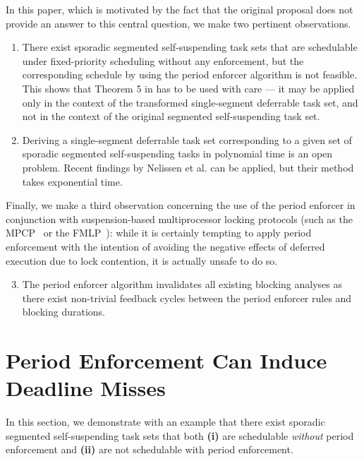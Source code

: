In this paper, which is motivated by the fact that the original proposal \cite{Raj:suspension1991} does not provide an answer to this central question, 
we make two pertinent observations.
\begin{enumerate}
	\item There exist sporadic segmented self-suspending task sets that are schedulable under fixed-priority scheduling without any enforcement, but the corresponding schedule by using the period enforcer algorithm is not feasible. This shows that Theorem 5 in \cite{Raj:suspension1991} has to be  used with care --- it may be applied only in the context of the transformed single-segment deferrable task set, and not in the context of the original segmented self-suspending task set.

	\item Deriving a single-segment deferrable task set corresponding to a given set of sporadic segmented self-suspending tasks in polynomial time is an open problem. Recent findings by Nelissen et al. \cite{ecrts15nelissen} can be applied, but their method takes exponential time.
\end{enumerate}
%
Finally, we make a third observation concerning the use of the period enforcer in conjunction with suspension-based multiprocessor locking protocols (such as the MPCP~\cite{LNR:09,Ra:90} or the FMLP~\cite{BLBA:07,BA:08}): while it is certainly tempting to apply period enforcement with the intention of avoiding the negative effects of deferred execution due to lock contention, it is actually unsafe to do so.
\begin{enumerate}
\setcounter{enumi}{2}
	\item The period enforcer algorithm invalidates all existing blocking analyses as there exist non-trivial feedback cycles between the period enforcer rules and blocking durations.
\end{enumerate}



\section{Period Enforcement Can Induce Deadline Misses}
\label{sec:unschedulable}

In this section, we demonstrate with an example that there exist sporadic  segmented self-suspending task sets that both \textbf{(i)} are schedulable \emph{without} period enforcement and \textbf{(ii)} are not schedulable with period enforcement.

